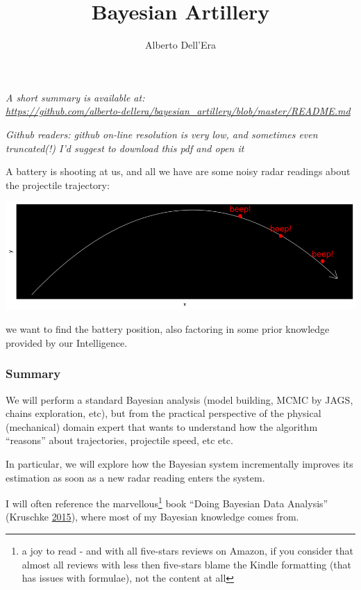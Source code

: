 \documentclass[]{article}
\title{Bayesian Artillery}
\author{Alberto Dell'Era}
\date{}
\begin{document}
\maketitle

\emph{A short summary is available at:\\
\url{https://github.com/alberto-dellera/bayesian_artillery/blob/master/README.md}
}

\emph{Github readers: github on-line resolution is very low, and
sometimes even truncated(!) I'd suggest to download this pdf and open
it}

A battery is shooting at us, and all we have are some noisy radar
readings about the projectile trajectory:

\includegraphics{static_images/simulate_cartoon-1.png}

we want to find the battery position, also factoring in some prior
knowledge provided by our Intelligence.

\hypertarget{summary}{%
\subsubsection{Summary}\label{summary}}

We will perform a standard Bayesian analysis (model building, MCMC by
JAGS, chains exploration, etc), but from the practical perspective of
the physical (mechanical) domain expert that wants to understand how the
algorithm ``reasons'' about trajectories, projectile speed, etc etc.

In particular, we will explore how the Bayesian system incrementally
improves its estimation as soon as a new radar reading enters the
system.

I will often reference the marvellous\footnote{a joy to read - and with
  all five-stars reviews on Amazon, if you consider that almost all
  reviews with less then five-stars blame the Kindle formatting (that
  has issues with formulae), not the content at all} book ``Doing
Bayesian Data Analysis'' (Kruschke
\protect\hyperlink{ref-DBDA2E}{2015}), where most of my Bayesian
knowledge comes from.
\end{document}
